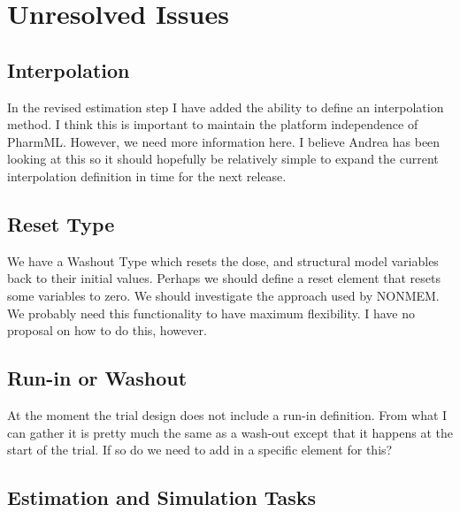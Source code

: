 \documentclass[a4paper,10pt]{article}
\newcommand{\pharmml}{PharmML\xspace}
\begin{document}
\section{Unresolved Issues}
\label{sec:unresolved-issues}

\subsection{Interpolation}

In the revised estimation step I have added the ability to define an
interpolation method. I think this is important to maintain the platform
independence of \pharmml. However, we need more information here. I
believe Andrea has been looking at this so it should hopefully be
relatively simple to expand the current interpolation definition in
time for the next release.

\subsection{Reset Type}

We have a Washout Type which resets the dose, and structural model
variables back to their initial values. Perhaps we should define a
reset element that resets some variables to zero. We should investigate
the approach used by NONMEM. We probably need this
functionality to have maximum flexibility. I have no proposal on how
to do this, however.

\subsection{Run-in or Washout}

At the moment the trial design does not include  a run-in
definition. From what I can gather it is pretty much the same as a
wash-out except that it happens at the start of the trial. If so do we
need to add in a specific element for this?

\subsection{Estimation and Simulation Tasks}
\end{document}
